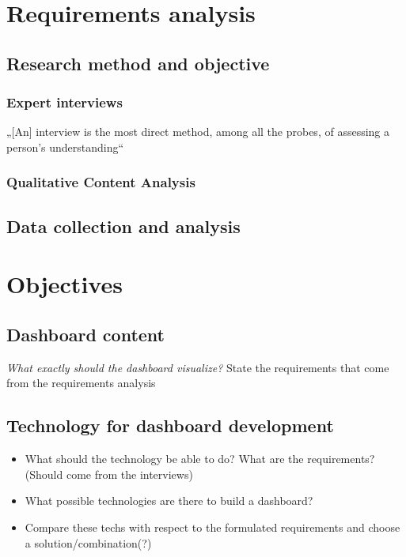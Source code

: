 \section{Requirements analysis}


\subsection{Research method and objective}

\subsubsection{Expert interviews}

„[An] interview is the most direct method, among all the probes, of assessing a person’s understanding“ \cite{}

\subsubsection{Qualitative Content Analysis}

\subsection{Data collection and analysis}

\section{Objectives}

\subsection{Dashboard content}
\textit{What exactly should the dashboard visualize?}
State the requirements that come from the requirements analysis

\subsection{Technology for dashboard development}
\begin{itemize}
    \item What should the technology be able to do? What are the requirements? (Should come from the interviews)
    \item What possible technologies are there to build a dashboard? 
    \item Compare these techs with respect to the formulated requirements and choose a solution/combination(?)
\end{itemize}

